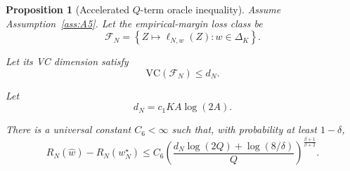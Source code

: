 \documentclass{article} %
\newtheorem{proposition}[theorem]{Proposition}
\providecommand{\simplex}{\Delta_K}
\providecommand{\Risk}{R}
\providecommand{\Fcal}{\mathcal{F}}
\providecommand{\VC}{\mathrm{VC}}
\providecommand{\what}{\widehat{w}}
\begin{document}
\begin{proposition}[Accelerated \(Q\)-term oracle inequality]
\label{prop:1}
Assume Assumption~\ref{ass:A5}.  Let the empirical-margin loss class be
\begin{equation}
\label{eq:prop1-class}
\Fcal_N
=
\left\{
Z\mapsto \ell_{N,w}(Z):w\in\simplex
\right\}.
\end{equation}

Let its VC dimension satisfy
\begin{equation}
\label{eq:prop1-vc}
\VC(\Fcal_N)
\le
d_N .
\end{equation}

Let
\begin{equation}
\label{eq:prop1-dN}
d_N
=
c_1 K A\log(2A).
\end{equation}

There is a universal constant \(C_6<\infty\) such that, with probability at
least \(1-\delta\),
\begin{equation}
\label{eq:prop1-bound}
\Risk_N(\what)-\Risk_N(w_N^\star)
\le
C_6
\left(
\frac{
d_N\log(2Q)+\log(8/\delta)
}{Q}
\right)^{\frac{\beta+1}{\beta+2}} .
\end{equation}
\end{proposition}
\end{document}
